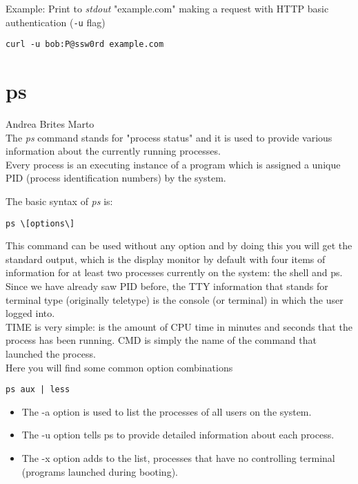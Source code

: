 \documentclass[hidelinks,12pt,a4paper,numbers=enddot]{scrartcl}
\begin{document}
Example: Print to \emph{stdout} "example.com" making a request with HTTP basic
authentication (\texttt{-u} flag)

\begin{verbatim}
curl -u bob:P@ssw0rd example.com
\end{verbatim}

\section{ps}


\large Andrea Brites Marto \normalsize\\





The \emph{ps} command stands for "process status" and it is used to provide
various information about the currently running processes.\\

Every process is an executing instance of a program which is assigned a unique PID
(process identification numbers) by the system.

The basic syntax of \emph{ps} is:

\begin{verbatim}
ps \[options\]
\end{verbatim}



This command can be used without any option and by doing this you will get the standard output,
which is the display monitor by default with four items of information for at least two
processes currently on the system: the shell and ps.\\

Since we have already saw PID before, the TTY information that stands for terminal type
(originally teletype) is the console (or terminal) in which the user logged into.\\

TIME is very simple: is the amount of CPU time in minutes and seconds that the process
has been running. CMD is simply the name of the command that launched the process.\\

Here you will find some common option combinations


\begin{verbatim}
ps aux | less
\end{verbatim}

\begin{itemize}
    \item The -a option is used to list the processes of all users on the system.
    \item The -u option tells ps to provide detailed information about each process.
    \item The -x option adds to the list, processes that have no controlling terminal
        (programs launched during booting).
    
\end{itemize}
\end{document}
